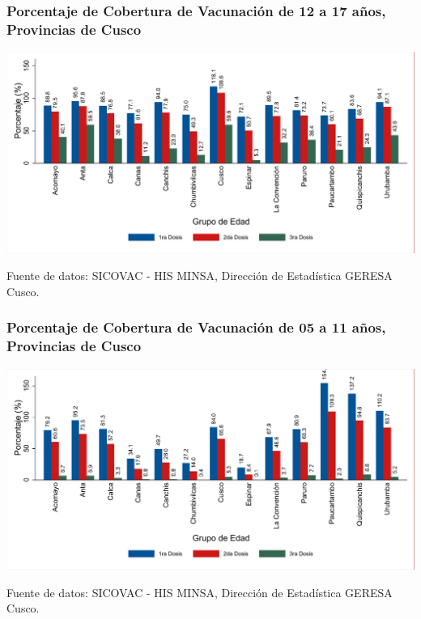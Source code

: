 \documentclass[xcolor=table]{beamer}
\begin{document}
\begin{frame}[label=vacunas_20]
	\frametitle{Porcentaje de Cobertura de Vacunación de 12 a 17 años, Provincias de Cusco}
	\vspace{-.5cm}
	\begin{center}
		\includegraphics[width=1.0\linewidth, trim={.2cm .5cm .2cm .2cm},clip]{../figuras/vacunacion_provincial_edad_practica_2.pdf}
	\end{center}
	{\tiny Fuente de datos: SICOVAC - HIS MINSA, Dirección de Estadística GERESA Cusco. \\}
\hyperlink{cobertura_vacuna_provincias}{}

\end{frame}

\begin{frame}[label=vacunas_10]
	\frametitle{Porcentaje de Cobertura de Vacunación de 05 a 11 años, Provincias de Cusco}
	\vspace{-.5cm}
	\begin{center}
		\includegraphics[width=1.0\linewidth, trim={.2cm .5cm .2cm .2cm},clip]{../figuras/vacunacion_provincial_edad_practica_1.pdf}
	\end{center}
	{\tiny Fuente de datos: SICOVAC - HIS MINSA, Dirección de Estadística GERESA Cusco. \\}
\hyperlink{cobertura_vacuna_provincias}{}
\end{frame}
\end{document}
